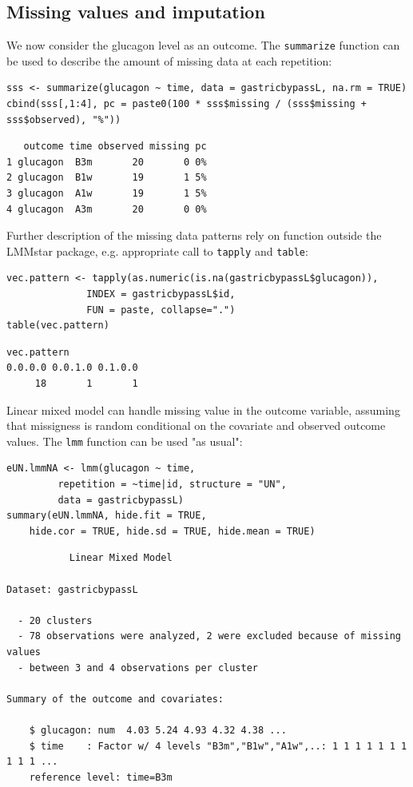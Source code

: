 \documentclass[12pt]{article}
\begin{document}
\subsection{Missing values and imputation}
\label{sec:orgc5591dc}


We now consider the glucagon level as an outcome. The \texttt{summarize}
function can be used to describe the amount of missing data at each
repetition:
\lstset{language=r,label= ,caption= ,captionpos=b,numbers=none}
\begin{lstlisting}
sss <- summarize(glucagon ~ time, data = gastricbypassL, na.rm = TRUE)
cbind(sss[,1:4], pc = paste0(100 * sss$missing / (sss$missing + sss$observed), "%"))
\end{lstlisting}

\begin{verbatim}
   outcome time observed missing pc
1 glucagon  B3m       20       0 0%
2 glucagon  B1w       19       1 5%
3 glucagon  A1w       19       1 5%
4 glucagon  A3m       20       0 0%
\end{verbatim}


Further description of the missing data patterns rely on function
outside the LMMstar package, e.g. appropriate call to \texttt{tapply} and
\texttt{table}:
\lstset{language=r,label= ,caption= ,captionpos=b,numbers=none}
\begin{lstlisting}
vec.pattern <- tapply(as.numeric(is.na(gastricbypassL$glucagon)),
		      INDEX = gastricbypassL$id,
		      FUN = paste, collapse=".")
table(vec.pattern)
\end{lstlisting}

\begin{verbatim}
vec.pattern
0.0.0.0 0.0.1.0 0.1.0.0 
     18       1       1
\end{verbatim}


Linear mixed model can handle missing value in the outcome variable,
assuming that missigness is random conditional on the covariate and
observed outcome values. The \texttt{lmm} function can be used "as usual":
\lstset{language=r,label= ,caption= ,captionpos=b,numbers=none}
\begin{lstlisting}
eUN.lmmNA <- lmm(glucagon ~ time,
		 repetition = ~time|id, structure = "UN",
		 data = gastricbypassL)
summary(eUN.lmmNA, hide.fit = TRUE,
	hide.cor = TRUE, hide.sd = TRUE, hide.mean = TRUE)
\end{lstlisting}

\begin{verbatim}
           Linear Mixed Model 
 
Dataset: gastricbypassL 

  - 20 clusters 
  - 78 observations were analyzed, 2 were excluded because of missing values 
  - between 3 and 4 observations per cluster 

Summary of the outcome and covariates: 

    $ glucagon: num  4.03 5.24 4.93 4.32 4.38 ...
    $ time    : Factor w/ 4 levels "B3m","B1w","A1w",..: 1 1 1 1 1 1 1 1 1 1 ...
    reference level: time=B3m
\end{verbatim}
\end{document}
